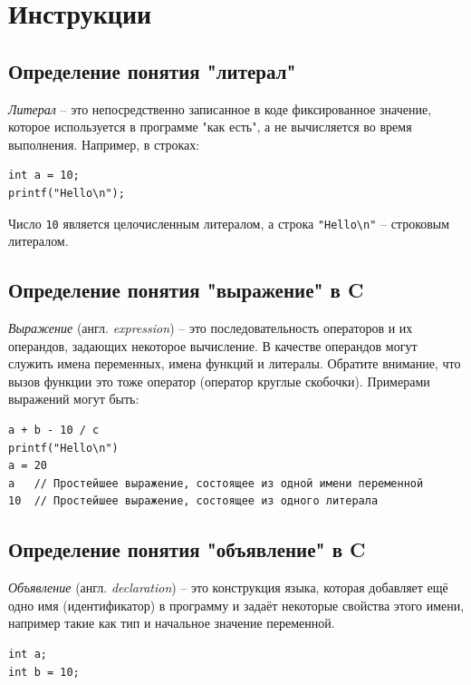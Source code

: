 \documentclass{article}
\begin{document}
\newpage

\section*{Инструкции}
\subsection*{Определение понятия "литерал"{}}
\textit{Литерал} -- это непосредственно записанное в коде фиксированное значение, которое используется в программе "как есть"{}, а не вычисляется во время выполнения. Например, в строках:
\begin{lstlisting}
int a = 10;
printf("Hello\n");
\end{lstlisting}
Число \texttt{10} является целочисленным литералом, а строка \texttt{"Hello\textbackslash n"} -- строковым литералом.

\subsection*{Определение понятия "выражение"{} в C}
\textit{Выражение} (англ. \textit{expression}) -- это последовательность операторов и их операндов, задающих некоторое вычисление. В качестве операндов могут служить имена переменных, имена функций и литералы. Обратите внимание, что вызов функции это тоже оператор (оператор круглые скобочки). Примерами выражений могут быть:
\begin{lstlisting}
a + b - 10 / c
printf("Hello\n")
a = 20
a  	// Простейшее выражение, состоящее из одной имени переменной
10  // Простейшее выражение, состоящее из одного литерала
\end{lstlisting}


\subsection*{Определение понятия "объявление"{} в C}
\textit{Объявление} (англ. \textit{declaration}) -- это конструкция языка, которая добавляет ещё одно имя (идентификатор) в программу и задаёт некоторые свойства этого имени, например такие как тип и начальное значение переменной.
\begin{lstlisting}
int a;
int b = 10;
\end{lstlisting}
\end{document}
